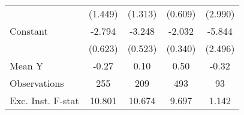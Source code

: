 {\begin{tabular}{l*{4}{c}}
                    &     (1.449)         &     (1.313)         &     (0.609)         &     (2.990)         \\
\addlinespace
Constant            &      -2.794\sym{***}&      -3.248\sym{***}&      -2.032\sym{***}&      -5.844\sym{**} \\
                    &     (0.623)         &     (0.523)         &     (0.340)         &     (2.496)         \\
\midrule
Mean Y              &       -0.27         &        0.10         &        0.50         &       -0.32         \\
Observations        &         255         &         209         &         493         &          93         \\
Exc. Inst. F-stat   &      10.801         &      10.674         &       9.697         &       1.142         \\
\bottomrule
\end{tabular}
}
